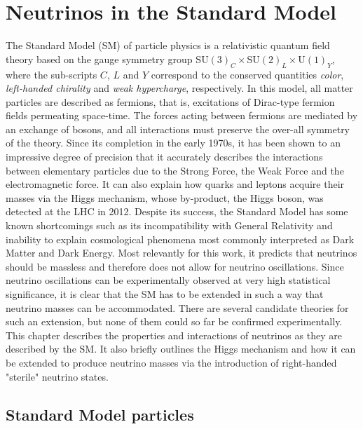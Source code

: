 \setchapterpreamble[u]{\margintoc}

\chapter{Neutrinos in the Standard Model}


The Standard Model (SM) of particle physics is a relativistic quantum field theory based on the gauge symmetry group $\mathrm{SU}(3)_C \times \mathrm{SU}(2)_L \times \mathrm{U}(1)_Y$, where the sub-scripts $C$, $L$ and $Y$ correspond to the conserved quantities \emph{color}, \emph{left-handed chirality} and \emph{weak hypercharge}, respectively. In this model, all matter particles are described as fermions, that is, excitations of Dirac-type fermion fields permeating space-time. The forces acting between fermions are mediated by an exchange of bosons, and all interactions must preserve the over-all symmetry of the theory. Since its completion in the early 1970s, it has been shown to an impressive degree of precision that it accurately describes the interactions between elementary particles due to the Strong Force, the Weak Force and the electromagnetic force. It can also explain how quarks and leptons acquire their masses via the Higgs mechanism, whose by-product, the Higgs boson, was detected at the LHC in 2012\cite{Aad_2012}. Despite its success, the Standard Model has some known shortcomings such as its incompatibility with General Relativity and inability to explain cosmological phenomena most commonly interpreted as Dark Matter and Dark Energy.  Most relevantly for this work, it predicts that neutrinos should be massless and therefore does not allow for neutrino oscillations. Since neutrino oscillations can be experimentally observed at very high statistical significance\cite{PhysRevLett.81.1562}, it is clear that the SM has to be extended in such a way that neutrino masses can be accommodated. There are several candidate theories for such an extension, but none of them could so far be confirmed experimentally. This chapter describes the properties and interactions of neutrinos as they are described by the SM. It also briefly outlines the Higgs mechanism and how it can be extended to produce neutrino masses via the introduction of right-handed "sterile" neutrino states.

\section{Standard Model particles}

